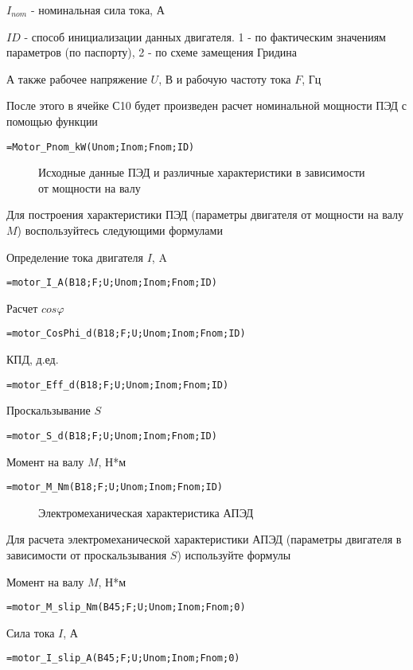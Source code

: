 $I_{nom}$ - номинальная сила тока, А

$ID$ - способ инициализации данных двигателя. 1 - по фактическим значениям параметров (по паспорту), 2 - по схеме замещения Гридина

А также рабочее напряжение $U$, В и рабочую частоту тока $F$, Гц

После этого в ячейке С10 будет произведен расчет номинальной мощности ПЭД с помощью функции

{ \small  \texttt{=Motor\_Pnom\_kW(Unom;Inom;Fnom;ID)}}

\begin{figure}[h!]
	\center{\texttt{[image: Ex80\_1]}}
	\caption{Исходные данные ПЭД и различные характеристики в зависимости от мощности на валу}
	\label{ris:Ex80_1}
\end{figure}

Для построения характеристики ПЭД (параметры двигателя от мощности на валу $M$) воспользуйтесь следующими формулами

Определение тока двигателя $I$, A

{ \small  \texttt{=motor\_I\_A(B18;F;U;Unom;Inom;Fnom;ID)}}

Расчет $cos \varphi $

{ \small  \texttt{=motor\_CosPhi\_d(B18;F;U;Unom;Inom;Fnom;ID)}}

КПД, д.ед.

{ \small  \texttt{=motor\_Eff\_d(B18;F;U;Unom;Inom;Fnom;ID)}}

Проскальзывание $S$

{ \small  \texttt{=motor\_S\_d(B18;F;U;Unom;Inom;Fnom;ID)}}

Момент на валу $M$, Н*м

{ \small  \texttt{=motor\_M\_Nm(B18;F;U;Unom;Inom;Fnom;ID)}}

\begin{figure}[h!]
	\center{\texttt{[image: Ex80\_2]}}
	\caption{Электромеханическая характеристика АПЭД}
	\label{ris:Ex80_2}
\end{figure}

Для расчета электромеханической характеристики АПЭД (параметры двигателя в зависимости от проскальзывания $S$) используйте формулы

Момент на валу $M$, Н*м 

{ \small  \texttt{=motor\_M\_slip\_Nm(B45;F;U;Unom;Inom;Fnom;0)}}

Сила тока $I$, А

{ \small  \texttt{=motor\_I\_slip\_A(B45;F;U;Unom;Inom;Fnom;0)}}


